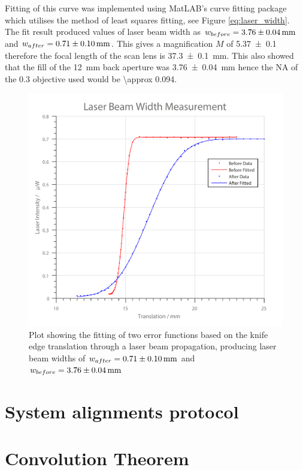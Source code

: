 Fitting of this curve was implemented using MatLAB's curve fitting package which utilises the method of least squares fitting, see Figure \ref{eq:laser_width}.
The fit result produced values of laser beam width as $w_{before} = \SI{3.76\pm0.04}{\milli\meter}$ and $w_{after} = \SI{0.71\pm0.1}{\milli\meter}$.
This gives a magnification $M$ of \SI{5.37 \pm 0.1}{} therefore the focal length of the scan lens is \SI{37.3\pm0.1}{\milli\meter}.
This also showed that the fill of the \SI{12}{\milli\meter} back aperture was \SI{3.76\pm0.04}{\milli\meter} hence the NA of the \num{0.3} objective used would be \SI{\approx 0.094}{}.

\begin{figure}
\centering
\includegraphics[width=0.7\linewidth]{./laser_width}
\caption[Laser Width Fitting]{Plot showing the fitting of two error functions based on the knife edge translation through a laser beam propagation, producing laser beam widths of $w_{after} = \SI{0.71\pm0.1}{\milli\meter}$ and $w_{before} = \SI{3.76\pm0.04}{\milli\meter}$}
\label{fig:laser_width}
\end{figure}

\section{System alignments protocol}


\section{Convolution Theorem}\label{appendix:convolution_theorem}

